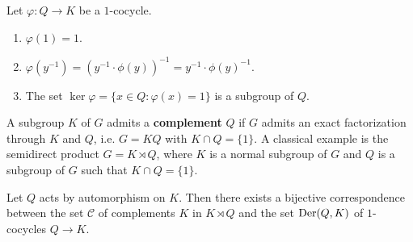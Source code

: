 
\begin{exercise}
	\label{xca:1cocycle}
	Let $\varphi\colon Q\to K$ be a $1$-cocycle. 
	\begin{enumerate}
		\item $\varphi(1)=1$.
		\item $\varphi(y^{-1})=(y^{-1}\cdot\phi(y))^{-1}=y^{-1}\cdot\phi(y)^{-1}$.
		\item The set $\ker\varphi=\{x\in Q:\varphi(x)=1\}$ is a subgroup of $Q$. 
	\end{enumerate}
\end{exercise}

A subgroup $K$ of $G$ admits a \textbf{complement} $Q$ if $G$ admits an exact factorization 
through $K$ and $Q$, i.e. $G=KQ$ with $K\cap Q=\{1\}$. 
A classical example is the semidirect product $G=K\rtimes Q$, where $K$ is a normal subgroup of $G$ 
and $Q$ is a subgroup of $G$ such that $K\cap Q=\{1\}$. 

\begin{theorem}
	\label{thm:complements}
	Let $Q$ acts by automorphism on $K$. Then there exists a bijective correspondence between
	the set $\mathcal{C}$ of complements $K$ in $K\rtimes Q$ and the set 
    $\operatorname{Der}(Q,K)$ of $1$-cocycles $Q\to K$.
\end{theorem}

